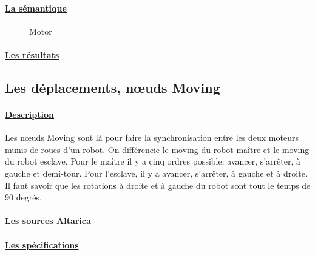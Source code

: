     \paragraph{\underline{La sémantique\\}}
    \begin{figure}[!ht]
     \begin{center}
      \caption{Motor}
     \end{center}
    \end{figure}

    \paragraph{\underline{Les résultats\\}}
    
    
   
  \subsection{Les déplacements, n\oe{uds Moving}}

    \paragraph{\underline{Description\\}}
    Les n\oe{}uds Moving sont là pour faire la synchronisation entre les deux moteurs
    munis de roues d'un robot. On différencie le moving du robot maître et le moving du robot esclave. Pour le maître il y a cinq ordres possible: avancer,
    s'arrêter, à gauche et demi-tour. Pour l'esclave, il y a avancer,
    s'arrêter, à gauche et à droite. Il faut savoir que les
    rotations à droite et à gauche du robot sont tout le temps de 90
    degrés.

    \paragraph{\underline{Les sources Altarica\\}}
    
    
    
    \paragraph{\underline{Les spécifications\\}}
    
    
    
